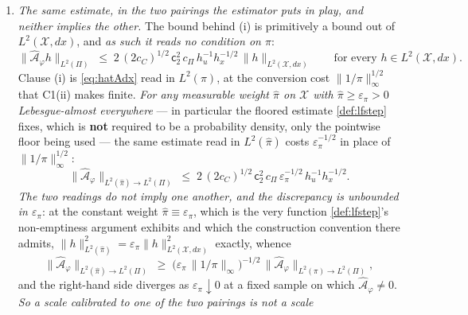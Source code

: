 \begin{proposition}
\begin{enumerate}
\eqref{eq:hatg} being $l$-free. Summing over $l$ against the masses therefore contributes
$\sum_l\varpi_{\mathsf w}(l)=1$, $\Pi_{\mathsf w}$ being a probability measure by B1(iv.d), and
$c_\Pi$ of B1(iv.c) is unchanged for the same reason. At $\mathsf L=2$ the sum has one term and
the derivation is the printed one.
\item[(i$'$)] \emph{The same estimate, in the two pairings the estimator puts in play, and neither
implies the other.} The bound behind \textup{(i)} is primitively a bound out of $L^{2}(\mathcal X,dx)$,
and \emph{as such it reads no condition on $\pi$}:
\begin{equation}\label{eq:hatAdx}
\big\|\hat{\mathcal A}_\varphi h\big\|_{L^{2}(\Pi)}\;\le\;
2\,(2c_C)^{1/2}\,\mathsf c_2^{2}\,c_\Pi\,h_u^{-1}h_x^{-1/2}\,\|h\|_{L^{2}(\mathcal X,dx)}
\qquad\text{for every }h\in L^{2}(\mathcal X,dx).
\end{equation}
Clause \textup{(i)} is \eqref{eq:hatAdx} read in $L^{2}(\pi)$, at the conversion cost
$\|1/\pi\|_\infty^{1/2}$ that C1(ii) makes finite. \emph{For any measurable weight $\hat\pi$ on
$\mathcal X$ with $\hat\pi\ge\varepsilon_\pi>0$ Lebesgue-almost everywhere} --- in particular the floored
estimate \cref{def:lfstep} fixes, which is \textbf{not} required to be a probability density, only the
pointwise floor being used --- the same estimate read in $L^{2}(\hat\pi)$ costs $\varepsilon_\pi^{-1/2}$
in place of $\|1/\pi\|_\infty^{1/2}$:
\begin{equation}\label{eq:hatAhatpi}
\big\|\hat{\mathcal A}_\varphi\big\|_{L^{2}(\hat\pi)\to L^{2}(\Pi)}\;\le\;
2\,(2c_C)^{1/2}\,\mathsf c_2^{2}\,c_\Pi\,\varepsilon_\pi^{-1/2}\,h_u^{-1}h_x^{-1/2} .
\end{equation}
\emph{The two readings do not imply one another, and the discrepancy is unbounded in $\varepsilon_\pi$}:
at the constant weight $\hat\pi\equiv\varepsilon_\pi$, which is the very function \cref{def:lfstep}'s
non-emptiness argument exhibits and which the construction convention there admits,
$\|h\|^{2}_{L^{2}(\hat\pi)}=\varepsilon_\pi\|h\|^{2}_{L^{2}(\mathcal X,dx)}$ exactly, whence
\begin{equation}\label{eq:pairgap}
\big\|\hat{\mathcal A}_\varphi\big\|_{L^{2}(\hat\pi)\to L^{2}(\Pi)}
\;\ge\;\big(\varepsilon_\pi\,\|1/\pi\|_\infty\big)^{-1/2}\,
\big\|\hat{\mathcal A}_\varphi\big\|_{L^{2}(\pi)\to L^{2}(\Pi)} ,
\end{equation}
and the right-hand side diverges as $\varepsilon_\pi\downarrow0$ at a fixed sample on which
$\hat{\mathcal A}_\varphi\neq0$. \emph{So a scale calibrated to one of the two pairings is not a scale
}
\end{enumerate}
\end{proposition}
